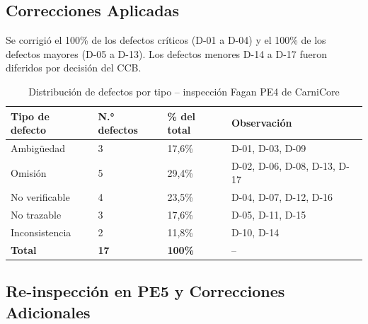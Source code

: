 \documentclass[11pt,a4paper]{article}
\begin{document}


\subsection{Correcciones Aplicadas}

Se corrigió el 100\% de los defectos críticos (D-01 a D-04) y el 100\% de los defectos mayores (D-05 a D-13). Los defectos menores D-14 a D-17 fueron diferidos por decisión del CCB.

\begin{table}[H]
\centering
\begin{tabular}{|p{3.5cm}|p{2.5cm}|p{2.5cm}|p{4cm}|}
\hline
\textbf{Tipo de defecto} & \textbf{N.° defectos} & \textbf{\% del total} & \textbf{Observación} \\
\hline
Ambigüedad & 3 & 17,6\% & D-01, D-03, D-09 \\
\hline
Omisión & 5 & 29,4\% & D-02, D-06, D-08, D-13, D-17 \\
\hline
No verificable & 4 & 23,5\% & D-04, D-07, D-12, D-16 \\
\hline
No trazable & 3 & 17,6\% & D-05, D-11, D-15 \\
\hline
Inconsistencia & 2 & 11,8\% & D-10, D-14 \\
\hline
\textbf{Total} & \textbf{17} & \textbf{100\%} & -- \\
\hline
\end{tabular}
\caption{Distribución de defectos por tipo -- inspección Fagan PE4 de CarniCore}
\label{tab:defectos_tipo}
\end{table}

\subsection{Re-inspección en PE5 y Correcciones Adicionales}
\end{document}
